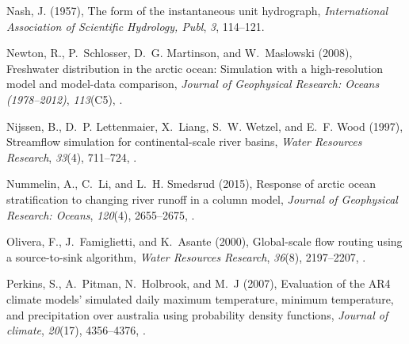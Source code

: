 \documentclass[jgrga, draft]{agutex}
\begin{document}
\begin{article}
\begin{thebibliography}{79}
Nash, J. (1957), The form of the instantaneous unit hydrograph,
  \textit{International Association of Scientific Hydrology, Publ}, \textit{3},
  114--121.

Newton, R., P.~Schlosser, D.~G. Martinson, and W.~Maslowski (2008), Freshwater
  distribution in the arctic ocean: Simulation with a high-resolution model and
  model-data comparison, \textit{Journal of Geophysical Research: Oceans
  (1978--2012)}, \textit{113}(C5), .

Nijssen, B., D.~P. Lettenmaier, X.~Liang, S.~W. Wetzel, and E.~F. Wood (1997),
  Streamflow simulation for continental-scale river basins, \textit{Water
  Resources Research}, \textit{33}(4), 711--724, .

Nummelin, A., C.~Li, and L.~H. Smedsrud (2015), Response of arctic ocean
  stratification to changing river runoff in a column model, \textit{Journal of
  Geophysical Research: Oceans}, \textit{120}(4), 2655--2675,
  .

Olivera, F., J.~Famiglietti, and K.~Asante (2000), Global-scale flow routing
  using a source-to-sink algorithm, \textit{Water Resources Research},
  \textit{36}(8), 2197--2207, .


Perkins, S., A.~Pitman, N.~Holbrook, and M.~J (2007), Evaluation of the {AR4}
  climate models' simulated daily maximum temperature, minimum temperature, and
  precipitation over australia using probability density functions,
  \textit{Journal of climate}, \textit{20}(17), 4356--4376,
  .


\end{thebibliography}
\end{article}
\end{document}
